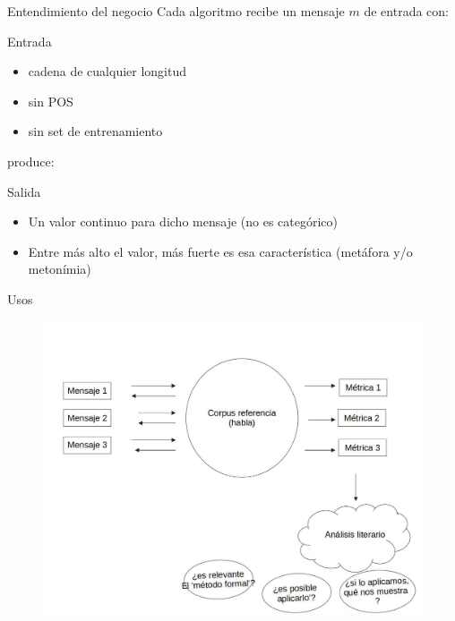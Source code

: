 \documentclass[presentation]{beamer}
\begin{document}
\begin{frame}[label={sec:orga7a4ca7}]{Entendimiento del negocio}
Cada algoritmo recibe un mensaje  \(m\) de entrada con:
\begin{block}{Entrada}
\begin{itemize}
\item cadena de cualquier longitud
\item sin POS
\item sin set de entrenamiento
\end{itemize}
\end{block}
produce:

\begin{block}{Salida}
\begin{itemize}
\item  Un valor continuo para dicho mensaje (no es categórico)
\item  Entre más alto el valor, más fuerte es esa característica (metáfora y/o metonímia)
\end{itemize}
\end{block}
\end{frame}

\begin{frame}[label={sec:orgd5b44b6}]{Usos}
  \begin{figure}
   \includegraphics[width=\textwidth]{./assets/posibles_usos.jpg}

\end{figure}
\end{frame}
\end{document}

